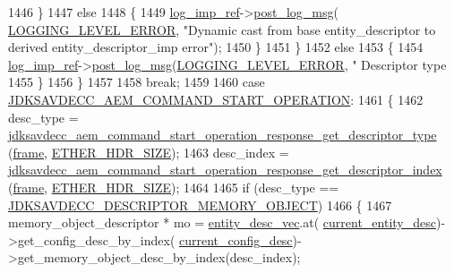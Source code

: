 \begin{DoxyCode}
{{{1446             \}
1447             \textcolor{keywordflow}{else}
1448             \{
1449                 \hyperlink{namespaceavdecc__lib_acbe3e2a96ae6524943ca532c87a28529}{log\_imp\_ref}->\hyperlink{classavdecc__lib_1_1log_a68139a6297697e4ccebf36ccfd02e44a}{post\_log\_msg}(
      \hyperlink{namespaceavdecc__lib_a501055c431e6872ef46f252ad13f85cdaf2c4481208273451a6f5c7bb9770ec8a}{LOGGING\_LEVEL\_ERROR}, \textcolor{stringliteral}{"Dynamic cast from base entity\_descriptor to derived
       entity\_descriptor\_imp error"});
1450             \}
1451         \}
1452         \textcolor{keywordflow}{else}
1453         \{
1454             \hyperlink{namespaceavdecc__lib_acbe3e2a96ae6524943ca532c87a28529}{log\_imp\_ref}->\hyperlink{classavdecc__lib_1_1log_a68139a6297697e4ccebf36ccfd02e44a}{post\_log\_msg}(\hyperlink{namespaceavdecc__lib_a501055c431e6872ef46f252ad13f85cdaf2c4481208273451a6f5c7bb9770ec8a}{LOGGING\_LEVEL\_ERROR}, \textcolor{stringliteral}{"
      Descriptor type %
1455         \}
1456     \}
1457 
1458     \textcolor{keywordflow}{break};
1459 
1460     \textcolor{keywordflow}{case} \hyperlink{group__command_ga6d1838e518b989e48a5cc727401fb4db}{JDKSAVDECC\_AEM\_COMMAND\_START\_OPERATION}:
1461     \{
1462         desc\_type = 
      \hyperlink{group__command__start__operation__response_gac02ea7a7cf4a61aa786fc7ec450e5aeb}{jdksavdecc\_aem\_command\_start\_operation\_response\_get\_descriptor\_type}
      (\hyperlink{gst__avb__playbin_8c_ac8e710e0b5e994c0545d75d69868c6f0}{frame}, \hyperlink{namespaceavdecc__lib_a6c827b1a0d973e18119c5e3da518e65ca9512ad9b34302ba7048d88197e0a2dc0}{ETHER\_HDR\_SIZE});
1463         desc\_index = 
      \hyperlink{group__command__start__operation__response_gad4092013dd41680f02f44140d179eb58}{jdksavdecc\_aem\_command\_start\_operation\_response\_get\_descriptor\_index}
      (\hyperlink{gst__avb__playbin_8c_ac8e710e0b5e994c0545d75d69868c6f0}{frame}, \hyperlink{namespaceavdecc__lib_a6c827b1a0d973e18119c5e3da518e65ca9512ad9b34302ba7048d88197e0a2dc0}{ETHER\_HDR\_SIZE});
1464 
1465         \textcolor{keywordflow}{if} (desc\_type == \hyperlink{group__descriptor_ga7d2dd5f18460db32b825ce78f19f8135}{JDKSAVDECC\_DESCRIPTOR\_MEMORY\_OBJECT})
1466         \{
1467             memory\_object\_descriptor * mo = \hyperlink{classavdecc__lib_1_1end__station__imp_a72edab41bc56e3c1757944a7df188a3d}{entity\_desc\_vec}.at(
      \hyperlink{classavdecc__lib_1_1end__station__imp_afd78c89df26ba7641e1adb764c0e827d}{current\_entity\_desc})->get\_config\_desc\_by\_index(
      \hyperlink{classavdecc__lib_1_1end__station__imp_a60b1af40d35e8a86b0082c54ab6cb6a8}{current\_config\_desc})->get\_memory\_object\_desc\_by\_index(desc\_index);
}}}}
\end{DoxyCode}
